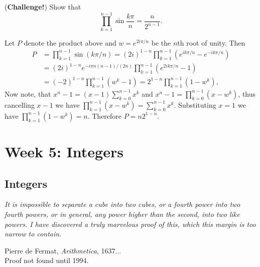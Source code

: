 \documentclass[11pt,dvipsnames]{book}
\numberwithin{equation}{section} %
\numberwithin{figure}{section} %
\numberwithin{table}{section} %
\begin{document}
\begin{exercise} ({\bf Challenge!}) Show that 
\[
\prod_{k=1}^{n-1}\sin\frac{k \pi}{n} = \frac{n}{2^{n-1}}.
\]

\begin{solution}
Let $P$ denote the product above and $w=e^{2i\pi/n}$ be the $n$th root of unity. Then
\begin{align*}
P 
& =\prod_{k=1}^{n-1}\sin(k\pi/n)=(2i)^{1-n}\prod_{k=1}^{n-1}(e^{ik\pi/n}-e^{-ik\pi/n})\\
& =(2i)^{1-n}e^{-i\pi n(n-1)/(2n)}\prod_{k=1}^{n-1}(e^{2ik\pi/n}-1)\\
& =(-2)^{1-n}\prod_{k=1}^{n-1}(w^k-1)=2^{1-n}\prod_{k=1}^{n-1}(1-w^k),
\end{align*}
Now note, that $x^n-1=(x-1)\sum_{k=0}^{n-1}x^k$ and $x^n-1=\prod_{k=0}^{n-1} (x-w^k)$, thus cancelling $x-1$ we have $\prod_{k=1}^{n-1} (x-w^k) =\sum_{k=0}^{n-1}x^k$. Substituting $x=1$ we have $\prod_{k=1}^{n-1} (1-w^k)=n$. Therefore $P=n2^{1-n}$.

\end{solution}

\end{exercise}













\part{Week 5: Integers}




\chapter{Integers}



\epigraph{\it It is impossible to separate a cube into two cubes, or a fourth power into two fourth powers, or in general, any power higher than the second, into two like powers. I have discovered a truly marvelous proof of this, which this margin is too narrow to contain.}{Pierre de Fermat, {\it Arithmetica}, 1637...\\ Proof not found until 1994.} 

\end{document}
